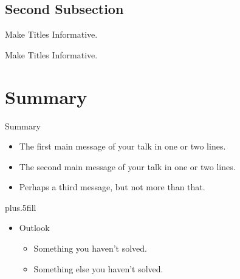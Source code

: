\documentclass{beamer}
\begin{document}
\subsection{Second Subsection}

\begin{frame}{Make Titles Informative.}
\end{frame}

\begin{frame}{Make Titles Informative.}
\end{frame}



\section*{Summary}

\begin{frame}{Summary}

  \begin{itemize}
  \item
    The \alert{first main message} of your talk in one or two lines.
  \item
    The \alert{second main message} of your talk in one or two lines.
  \item
    Perhaps a \alert{third message}, but not more than that.
  \end{itemize}
  
  \vskip0pt plus.5fill
  \begin{itemize}
  \item
    Outlook
    \begin{itemize}
    \item
      Something you haven't solved.
    \item
      Something else you haven't solved.
    \end{itemize}
  \end{itemize}
\end{frame}
\end{document}
